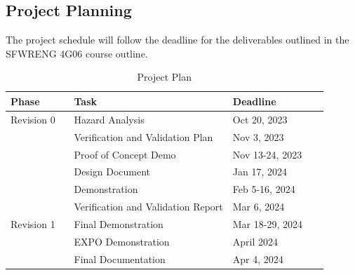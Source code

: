 \documentclass[12pt]{article}
\begin{document}
\subsection{Project Planning}

The project schedule will follow the deadline for the deliverables outlined in the SFWRENG
4G06 course outline.

\begin{table}[H]
    \centering
    \begin{tabular}{|p{0.2\linewidth} | p{0.5\linewidth}| p{0.3\linewidth} |}
    \hline
    \textbf{Phase} & \textbf{Task} & \textbf{Deadline}\\
    \hline
    Revision 0 & Hazard Analysis & Oct 20, 2023 \\
     \cline{2-3} & Verification and Validation Plan & Nov 3, 2023 \\
     \cline{2-3} & Proof of Concept Demo & Nov 13-24, 2023\\
     \cline{2-3} & Design Document & Jan 17, 2024\\
     \cline{2-3} & Demonstration & Feb 5-16, 2024\\
     \cline{2-3} & Verification and Validation Report & Mar 6, 2024\\
     \hline
     Revision 1 & Final Demonstration & Mar 18-29, 2024\\
     \cline{2-3} & EXPO Demonstration & April 2024\\
     \cline{2-3} & Final Documentation & Apr 4, 2024\\
     
     
     
     
     
    \hline
    \end{tabular}
    \caption{Project Plan}
    \label{TblProjectTasks}
\end{table}
\end{document}

